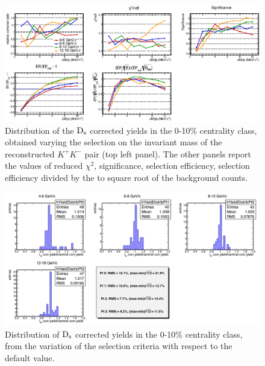 \begin{figure}[!h]
 \begin{center}
   \includegraphics[angle=0, width=15cm]{./FigCap5/cutbycut_invm_010.eps}
 \end{center}
 \caption{Distribution of the ${\rm D_s}$ corrected yields in the 0-10\% centrality class, obtained varying the selection on the invariant mass of the reconstructed $K^+K^-$ pair (top left panel). The other panels report the values of reduced $\chi^2$, significance, selection efficiency, selection efficiency divided by the to square root of the background counts.}
 \label{DsCutVar_010} 
\end{figure}
\begin{figure}[!h]
 \begin{center}
   \includegraphics[angle=0, width=15cm]{./FigCap5/FinalSyst_010.png}
 \end{center}
 \caption{Distribution of ${\rm D_s}$ corrected yields in the 0-10\% centrality class, from the variation of the selection criteria with respect to the default value.}
 \label{fig:DsCutVar_010} 
\end{figure}

